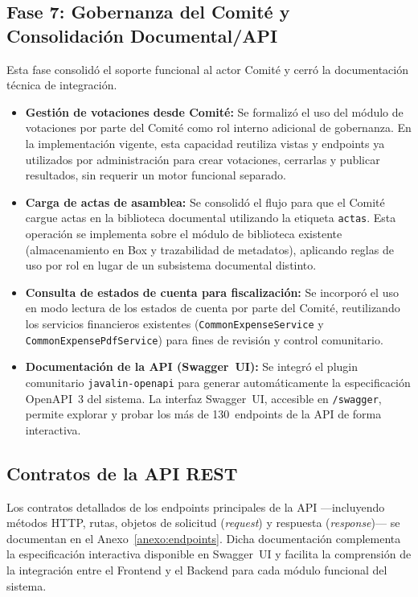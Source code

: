 \subsection{Fase 7: Gobernanza del Comité y Consolidación Documental/API}
Esta fase consolidó el soporte funcional al actor Comité y cerró la documentación técnica de integración.
\begin{itemize}
    \item \textbf{Gestión de votaciones desde Comité:} Se formalizó el uso del módulo de votaciones por parte del Comité como rol interno adicional de gobernanza. En la implementación vigente, esta capacidad reutiliza vistas y endpoints ya utilizados por administración para crear votaciones, cerrarlas y publicar resultados, sin requerir un motor funcional separado.
    \item \textbf{Carga de actas de asamblea:} Se consolidó el flujo para que el Comité cargue actas en la biblioteca documental utilizando la etiqueta \texttt{actas}. Esta operación se implementa sobre el módulo de biblioteca existente (almacenamiento en Box y trazabilidad de metadatos), aplicando reglas de uso por rol en lugar de un subsistema documental distinto.
    \item \textbf{Consulta de estados de cuenta para fiscalización:} Se incorporó el uso en modo lectura de los estados de cuenta por parte del Comité, reutilizando los servicios financieros existentes (\texttt{CommonExpenseService} y \texttt{CommonExpensePdfService}) para fines de revisión y control comunitario.
    \item \textbf{Documentación de la API (Swagger~UI):} Se integró el plugin comunitario \texttt{javalin-openapi} para generar automáticamente la especificación OpenAPI~3 del sistema. La interfaz Swagger~UI, accesible en \texttt{/swagger}, permite explorar y probar los más de 130~endpoints de la API de forma interactiva.
\end{itemize}

\subsection{Contratos de la API REST}
Los contratos detallados de los endpoints principales de la API ---incluyendo
métodos HTTP, rutas, objetos de solicitud (\textit{request}) y respuesta
(\textit{response})--- se documentan en el Anexo~\ref{anexo:endpoints}.
Dicha documentación complementa la especificación interactiva disponible
en Swagger~UI y facilita la comprensión de la integración entre el Frontend
y el Backend para cada módulo funcional del sistema.

